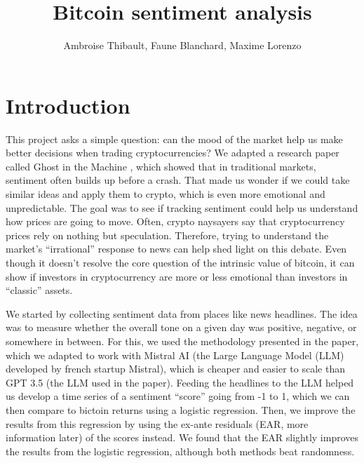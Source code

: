\documentclass[
  a4paper]{article}
\title{Bitcoin sentiment analysis}
\author{Ambroise Thibault, Faune Blanchard, Maxime Lorenzo}
\date{}
\renewcommand*\contentsname{Table of contents}
\newcommand\contentsname{Table of contents}
\begin{document}
\maketitle
\ifdefined\Shaded\renewenvironment{Shaded}{\begin{tcolorbox}[boxrule=0pt, sharp corners, frame hidden, enhanced, borderline west={3pt}{0pt}{shadecolor}, breakable, interior hidden]}{\end{tcolorbox}}\fi

\renewcommand*\contentsname{Table of contents}
{
\hypersetup{linkcolor=}
\setcounter{tocdepth}{4}
\tableofcontents
}
\hypertarget{introduction}{%
\section{Introduction}\label{introduction}}

This project asks a simple question: can the mood of the market help us
make better decisions when trading cryptocurrencies? We adapted a
research paper called Ghost in the Machine \textcite{leland_bybee_2025},
which showed that in traditional markets, sentiment often builds up
before a crash. That made us wonder if we could take similar ideas and
apply them to crypto, which is even more emotional and unpredictable.
The goal was to see if tracking sentiment could help us understand how
prices are going to move. Often, crypto naysayers say that
cryptocurrency prices rely on nothing but speculation. Therefore, trying
to understand the market's ``irrational'' response to news can help shed
light on this debate. Even though it doesn't resolve the core question
of the intrinsic value of bitcoin, it can show if investors in
cryptocurrency are more or less emotional than investors in ``classic''
assets.

We started by collecting sentiment data from places like news headlines.
The idea was to measure whether the overall tone on a given day was
positive, negative, or somewhere in between. For this, we used the
methodology presented in the paper, which we adapted to work with
Mistral AI (the Large Language Model (LLM) developed by french startup
Mistral), which is cheaper and easier to scale than GPT 3.5 (the LLM
used in the paper). Feeding the headlines to the LLM helped us develop a
time series of a sentiment ``score'' going from -1 to 1, which we can
then compare to bictoin returns using a logistic regression. Then, we
improve the results from this regression by using the ex-ante residuals
(EAR, more information later) of the scores instead. We found that the
EAR slightly improves the results from the logistic regression, although
both methods beat randomness.
\end{document}
